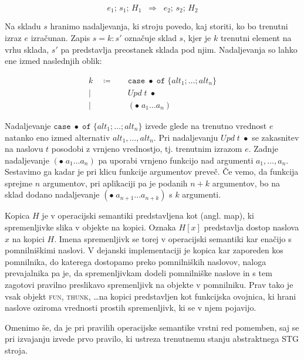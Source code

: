 \begin{equation}
	e_1; \, s_1; \, H_1  \;\; \Rightarrow  \;\; e_2; \, s_2; \, H_2
	\label{eq:operacijska-semantika-oblika-pravil}
\end{equation}

Na skladu $s$ hranimo nadaljevanja, ki stroju povedo, kaj storiti, ko bo trenutni izraz $e$ izračunan. Zapis $s = k : s'$ označuje sklad $s$, kjer je $k$ trenutni element na vrhu sklada, $s'$ pa predstavlja preostanek sklada pod njim. Nadaljevanja so lahko ene izmed naslednjih oblik:

\begin{align*}
	k \quad \coloneq& \quad \texttt{case} \; \bullet \; \texttt{of} \; \{ alt_1; \dots; alt_n \}\\
	\vert& \quad \textit{Upd} \; t \; \bullet\\
	\vert& \quad (\bullet \; a_1 \dots a_n)
\end{align*}

Nadaljevanje $\texttt{case} \; \bullet \; \texttt{of} \; \{ alt_1; \dots; alt_n \}$ izvede glede na trenutno vrednost $e$ natanko eno izmed alternativ $alt_1, \dots, alt_n$. Pri nadaljevanju $\textit{Upd} \; t \; \bullet$ se zakasnitev na naslovu $t$ posodobi z vrnjeno vrednostjo, tj. trenutnim izrazom $e$.  Zadnje nadaljevanje $(\bullet \; a_1 \dots a_n)$ pa uporabi vrnjeno funkcijo nad argumenti $a_1, \dots, a_n$. Sestavimo ga kadar je pri klicu funkcije argumentov preveč. Če vemo, da funkcija sprejme $n$ argumentov, pri aplikaciji pa je podanih $n + k$ argumentov, bo na sklad dodano nadaljevanje $(\bullet \; a_{n + 1 } \dots a_{ n + k })$ s $k$ argumenti.

Kopica $H$ je v operacijski semantiki predstavljena kot  (angl. map), ki spremenljivke slika v objekte na kopici. Oznaka $H[x]$ predstavlja dostop naslova $x$ na kopici $H$. Imena spremenljivk se torej v operacijski semantiki kar enačijo s pomnilniškimi naslovi. V dejanski implementaciji je kopica kar zaporeden kos pomnilnika, do katerega dostopamo preko pomnilniških naslovov, naloga prevajalnika pa je, da spremenljivkam dodeli pomnilniške naslove in s tem zagotovi pravilno preslikavo spremenljivk na objekte v pomnilniku. Prav tako je vsak objekt \textsc{fun}, \textsc{thunk}, \dots na kopici predstavljen kot funkcijska ovojnica, ki hrani naslove oziroma vrednosti prostih spremenljivk, ki se v njem pojavijo.

Omenimo še, da je pri pravilih operacijske semantike vrstni red pomemben, saj se pri izvajanju izvede prvo pravilo, ki ustreza trenutnemu stanju abstraktnega STG stroja.

